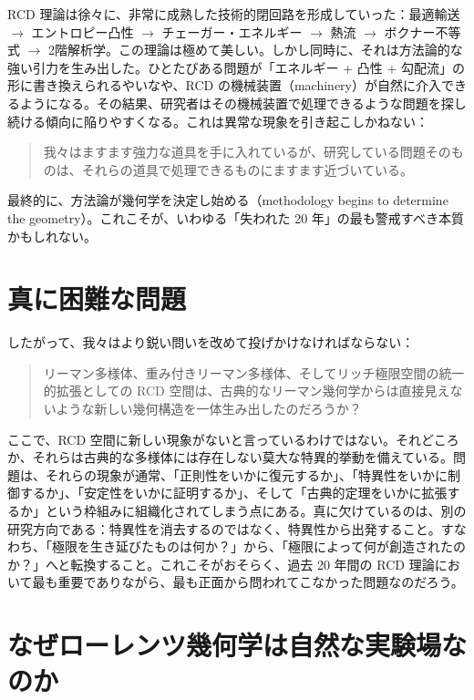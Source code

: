 \documentclass[lualatex]{ltjsarticle}
\begin{document}
RCD 理論は徐々に、非常に成熟した技術的閉回路を形成していった：最適輸送 $\longrightarrow$ エントロピー凸性 $\longrightarrow$ チェーガー・エネルギー $\longrightarrow$ 熱流 $\longrightarrow$ ボクナー不等式 $\longrightarrow$ 2階解析学。この理論は極めて美しい。しかし同時に、それは方法論的な強い引力を生み出した。ひとたびある問題が「エネルギー + 凸性 + 勾配流」の形に書き換えられるやいなや、RCD の機械装置（machinery）が自然に介入できるようになる。その結果、研究者はその機械装置で処理できるような問題を探し続ける傾向に陥りやすくなる。これは異常な現象を引き起こしかねない：

\begin{quote}
我々はますます強力な道具を手に入れているが、研究している問題そのものは、それらの道具で処理できるものにますます近づいている。
\end{quote}

最終的に、方法論が幾何学を決定し始める（methodology begins to determine the geometry）。これこそが、いわゆる「失われた 20 年」の最も警戒すべき本質かもしれない。

\section{真に困難な問題}

したがって、我々はより鋭い問いを改めて投げかけなければならない：

\begin{quote}
リーマン多様体、重み付きリーマン多様体、そしてリッチ極限空間の統一的拡張としての RCD 空間は、古典的なリーマン幾何学からは直接見えないような新しい幾何構造を一体生み出したのだろうか？
\end{quote}

ここで、RCD 空間に新しい現象がないと言っているわけではない。それどころか、それらは古典的な多様体には存在しない莫大な特異的挙動を備えている。問題は、それらの現象が通常、「正則性をいかに復元するか」、「特異性をいかに制御するか」、「安定性をいかに証明するか」、そして「古典的定理をいかに拡張するか」という枠組みに組織化されてしまう点にある。真に欠けているのは、別の研究方向である：特異性を消去するのではなく、特異性から出発すること。すなわち、「極限を生き延びたものは何か？」から、「極限によって何が創造されたのか？」へと転換すること。これこそがおそらく、過去 20 年間の RCD 理論において最も重要でありながら、最も正面から問われてこなかった問題なのだろう。

\section{なぜローレンツ幾何学は自然な実験場なのか}
\end{document}
